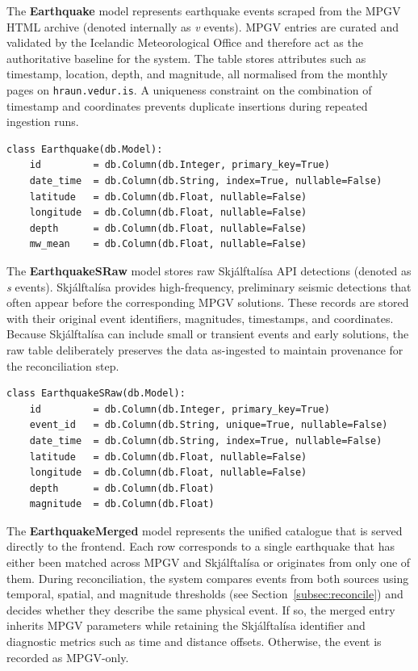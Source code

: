 \documentclass[12pt]{article}
\begin{document}
The \textbf{Earthquake} model represents earthquake events scraped from the MPGV HTML archive (denoted internally as \emph{v} events). MPGV entries are curated and validated by the Icelandic Meteorological Office and therefore act as the authoritative baseline for the system. The table stores attributes such as timestamp, location, depth, and magnitude, all normalised from the monthly pages on \texttt{hraun.vedur.is}. A uniqueness constraint on the combination of timestamp and coordinates prevents duplicate insertions during repeated ingestion runs.

\begin{verbatim}
class Earthquake(db.Model):
    id         = db.Column(db.Integer, primary_key=True)
    date_time  = db.Column(db.String, index=True, nullable=False)
    latitude   = db.Column(db.Float, nullable=False)
    longitude  = db.Column(db.Float, nullable=False)
    depth      = db.Column(db.Float, nullable=False)
    mw_mean    = db.Column(db.Float, nullable=False)
\end{verbatim}

The \textbf{EarthquakeSRaw} model stores raw Skjálftalísa API detections (denoted as \emph{s} events). Skjálftalísa provides high-frequency, preliminary seismic detections that often appear before the corresponding MPGV solutions. These records are stored with their original event identifiers, magnitudes, timestamps, and coordinates. Because Skjálftalísa can include small or transient events and early solutions, the raw table deliberately preserves the data as-ingested to maintain provenance for the reconciliation step.

\begin{verbatim}
class EarthquakeSRaw(db.Model):
    id         = db.Column(db.Integer, primary_key=True)
    event_id   = db.Column(db.String, unique=True, nullable=False)
    date_time  = db.Column(db.String, index=True, nullable=False)
    latitude   = db.Column(db.Float, nullable=False)
    longitude  = db.Column(db.Float, nullable=False)
    depth      = db.Column(db.Float)
    magnitude  = db.Column(db.Float)
\end{verbatim}

The \textbf{EarthquakeMerged} model represents the unified catalogue that is served directly to the frontend. Each row corresponds to a single earthquake that has either been matched across MPGV and Skjálftalísa or originates from only one of them. During reconciliation, the system compares events from both sources using temporal, spatial, and magnitude thresholds (see Section~\ref{subsec:reconcile}) and decides whether they describe the same physical event. If so, the merged entry inherits MPGV parameters while retaining the Skjálftalísa identifier and diagnostic metrics such as time and distance offsets. Otherwise, the event is recorded as MPGV-only.
\end{document}
